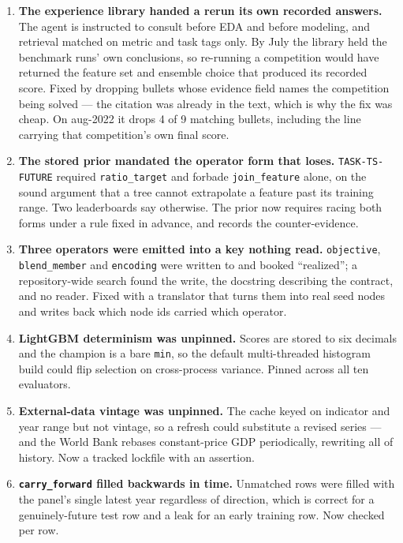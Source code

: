 \documentclass[11pt,a4paper]{article}
\begin{document}
\begin{enumerate}[leftmargin=*]
  \item \textbf{The experience library handed a rerun its own recorded answers.} The agent is
  instructed to consult  before EDA and before modeling, and
  retrieval matched on metric and task tags only. By July the library held the benchmark runs'
  own conclusions, so re-running a competition would have returned the feature set and
  ensemble choice that produced its recorded score. Fixed by dropping bullets whose evidence
  field names the competition being solved --- the citation was already in the text, which is
  why the fix was cheap. On aug-2022 it drops 4 of 9 matching bullets, including the line
  carrying that competition's own final score.

  \item \textbf{The stored prior mandated the operator form that loses.} \texttt{TASK-TS-FUTURE}
  required \texttt{ratio\_target} and forbade \texttt{join\_feature} alone, on the sound
  argument that a tree cannot extrapolate a feature past its training range. Two leaderboards
  say otherwise. The prior now requires racing both forms under a rule fixed in advance, and
  records the counter-evidence.

  \item \textbf{Three operators were emitted into a key nothing read.} \texttt{objective},
  \texttt{blend\_member} and \texttt{encoding} were written to  and
  booked ``realized''; a repository-wide search found the write, the docstring describing the
  contract, and no reader. Fixed with a translator that turns them into real seed nodes and
  writes back which node ids carried which operator.

  \item \textbf{LightGBM determinism was unpinned.} Scores are stored to six decimals and the
  champion is a bare \texttt{min}, so the default multi-threaded histogram build could flip
  selection on cross-process variance. Pinned across all ten evaluators.

  \item \textbf{External-data vintage was unpinned.} The cache keyed on indicator and year
  range but not vintage, so a refresh could substitute a revised series --- and the World Bank
  rebases constant-price GDP periodically, rewriting all of history. Now a tracked lockfile
  with an assertion.

  \item \textbf{\texttt{carry\_forward} filled backwards in time.} Unmatched rows were filled
  with the panel's single latest year regardless of direction, which is correct for a
  genuinely-future test row and a leak for an early training row. Now checked per row.


\end{enumerate}
\end{document}
